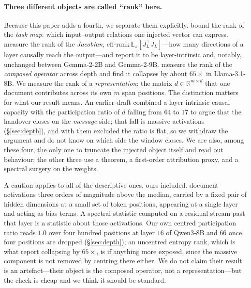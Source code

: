\documentclass{article}
\newcommand{\dvec}{\ensuremath{d}}
\begin{document}
\paragraph{Three different objects are called ``rank'' here.} Because this paper
adds a fourth, we separate them explicitly. \citet{dong2026taskvectorlimits}
bound the rank of the \emph{task map}: which input--output relations one
injected vector can express. \citet{sarkar2026causaldim} measure the rank of the
\emph{Jacobian}, $\mathrm{eff\text{-}rank}\,\mathbb{E}_x[J_L^\top J_L]$---how
many directions of a layer causally reach the output---and report it to be
layer-intrinsic and, notably, unchanged between Gemma-2-2B and Gemma-2-9B.
\citet{fernando2026residualspectral} measure the rank of the \emph{composed
operator} across depth and find it collapses by about $65\times$ in
Llama-3.1-8B. We measure the rank of a \emph{representation}: the matrix
$\dvec\in\mathbb{R}^{m\times d}$ that one document contributes across its own
$m$ span positions. The distinction matters for what our result means. An
earlier draft combined a layer-intrinsic causal capacity
\citep{sarkar2026causaldim} with the participation ratio of $\dvec$ falling from
$64$ to $17$ to argue that the handover closes on the \emph{message} side; that
fall is massive activations (\S\ref{sec:depth}), and with them excluded the
ratio is flat, so we withdraw the argument and do not know on which side the
window closes. We are also, among these four, the only one to truncate the
injected object itself and read out behaviour; the other three use a theorem, a
first-order attribution proxy, and a spectral surgery on the weights.

A caution applies to all of the descriptive ones, ours included.
\citet{sun2024massive} document activations three orders of magnitude above the
median, carried by a fixed pair of hidden dimensions at a small set of token
positions, appearing at a single layer \citep{shi2026melayer} and acting as
bias terms. A spectral statistic computed on a residual stream past that layer
is a statistic about those activations. Our own centred participation ratio
reads $1.0$ over four hundred positions at layer $16$ of Qwen3-8B and $66$ once
four positions are dropped (\S\ref{sec:depth}); an uncentred entropy rank, which
is what \citet{fernando2026residualspectral} report collapsing by $65\times$, is
if anything more exposed, since the massive component is not removed by
centring there either. We do not claim their result is an artefact---their
object is the composed operator, not a representation---but the check is cheap
and we think it should be standard.
\end{document}
